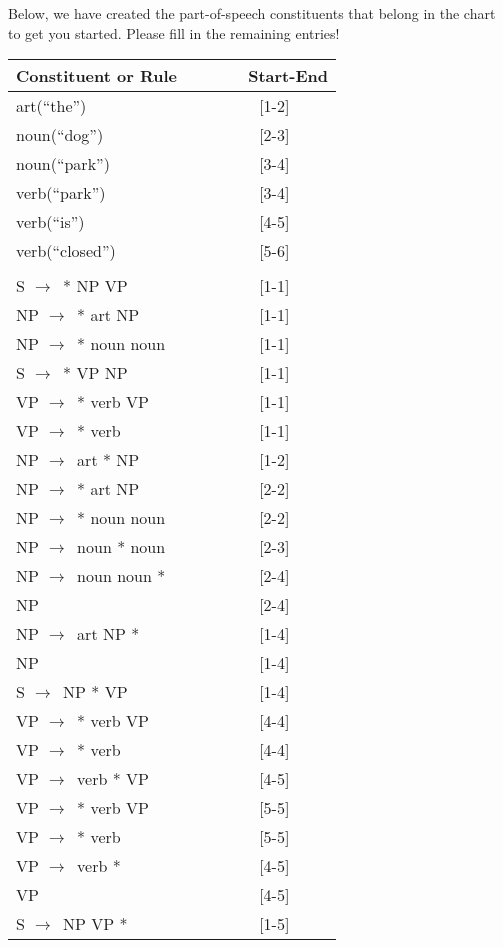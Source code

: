 \documentclass[11pt]{article}
\newcommand{\ra}{$\rightarrow$~}
\begin{document}
\begin{enumerate}
Below, we have created the part-of-speech constituents that belong in the chart to get you
started. Please fill in the remaining entries!

\begin{center}
 \begin{tabular}{lc} {\bf Constituent or Rule~~~} & {\bf ~~~Start-End} \\ \hline 
 art(``the'') &  [1-2] \\
 noun(``dog'') & [2-3] \\
 noun(``park'') & [3-4] \\
 verb(``park'') & [3-4]  \\
 verb(``is'') & [4-5] \\
 verb(``closed'') & [5-6] \\\hline\\
 S \ra * NP VP & [1-1] \\
 NP \ra * art NP & [1-1] \\
 NP \ra * noun noun & [1-1] \\
 S \ra * VP NP & [1-1] \\
 VP \ra * verb VP & [1-1] \\
 VP \ra * verb & [1-1] \\
 NP \ra art * NP & [1-2] \\
 NP \ra * art NP & [2-2] \\
 NP \ra * noun noun & [2-2] \\
 NP \ra noun * noun & [2-3] \\
 NP \ra noun noun * & [2-4] \\
 NP & [2-4] \\
 NP \ra art NP * & [1-4] \\
 NP & [1-4] \\
 S \ra NP * VP & [1-4] \\
 VP \ra * verb VP & [4-4] \\
 VP \ra * verb & [4-4] \\
 VP \ra verb * VP & [4-5] \\
 VP \ra * verb VP & [5-5] \\
 VP \ra * verb & [5-5] \\
 VP \ra verb * & [4-5] \\
 VP & [4-5] \\
 S \ra NP VP * & [1-5] \\

\end{tabular}
\end{center}
\end{enumerate}
\end{document}
